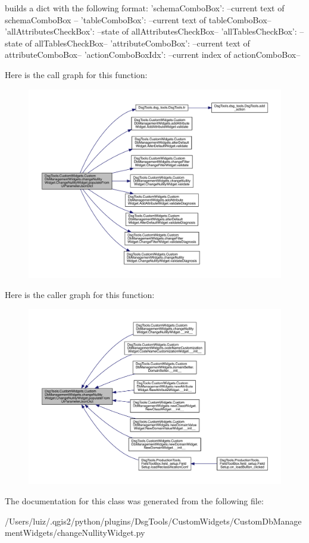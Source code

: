 \begin{DoxyVerb}builds a dict with the following format:
{
    'schemaComboBox': --current text of schemaComboBox --
    'tableComboBox': --current text of tableComboBox--
    'allAttributesCheckBox': --state of allAttributesCheckBox--
    'allTablesCheckBox': --state of allTablesCheckBox--
    'attributeComboBox': --current text of attributeComboBox--
    'actionComboBoxIdx': --current index of actionComboBox--
}
\end{DoxyVerb}
 Here is the call graph for this function\+:
\nopagebreak
\begin{figure}[H]
\begin{center}
\leavevmode
\includegraphics[width=350pt]{class_dsg_tools_1_1_custom_widgets_1_1_custom_db_management_widgets_1_1change_nullity_widget_1_1_change_nullity_widget_a8ec7f953cd76042117d056f7d52c03a5_cgraph}
\end{center}
\end{figure}
Here is the caller graph for this function\+:
\nopagebreak
\begin{figure}[H]
\begin{center}
\leavevmode
\includegraphics[width=350pt]{class_dsg_tools_1_1_custom_widgets_1_1_custom_db_management_widgets_1_1change_nullity_widget_1_1_change_nullity_widget_a8ec7f953cd76042117d056f7d52c03a5_icgraph}
\end{center}
\end{figure}


The documentation for this class was generated from the following file\+:\begin{DoxyCompactItemize}
\item 
/\+Users/luiz/.\+qgis2/python/plugins/\+Dsg\+Tools/\+Custom\+Widgets/\+Custom\+Db\+Management\+Widgets/change\+Nullity\+Widget.\+py\end{DoxyCompactItemize}

